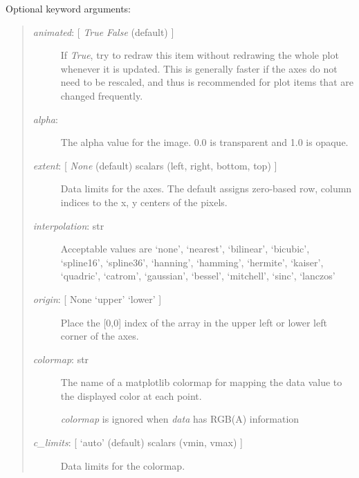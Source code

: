 \documentclass[letterpaper,10pt,english]{sphinxmanual}
\begin{document}
\begin{fulllineitems}
\begin{fulllineitems}
\begin{quote}
\begin{description}
\end{description}
\end{quote}

Optional keyword arguments:
\begin{quote}
\begin{description}
\item[{\emph{animated}: {[} \emph{True} \textbar{} \emph{False} (default) {]}}] \leavevmode
If \emph{True}, try to redraw this item without redrawing the whole plot
whenever it is updated. This is generally faster if the axes do not
need to be rescaled, and thus is recommended for plot items that 
are changed frequently.

\item[{\emph{alpha}: }] \leavevmode
The alpha value for the image. 0.0 is transparent and 1.0 is opaque.

\item[{\emph{extent}:  {[} \emph{None} (default) \textbar{} scalars (left, right, bottom, top) {]}}] \leavevmode
Data limits for the axes. The default assigns zero-based row, 
column indices to the x, y centers of the pixels.

\item[{\emph{interpolation}: str}] \leavevmode
Acceptable values are `none', `nearest', `bilinear',
`bicubic', `spline16', `spline36', `hanning', `hamming',
`hermite', `kaiser', `quadric', `catrom', `gaussian',
`bessel', `mitchell', `sinc', `lanczos'

\item[{\emph{origin}: {[} None \textbar{} `upper' \textbar{} `lower' {]}}] \leavevmode
Place the {[}0,0{]} index of the array in the upper left or lower left 
corner of the axes.

\item[{\emph{colormap}: str}] \leavevmode
The name of a matplotlib colormap for mapping the data value to the
displayed color at each point.

\emph{colormap} is ignored when \emph{data} has RGB(A) information

\item[{\emph{c\_limits}:  {[} `auto' (default) \textbar{} scalars (vmin, vmax) {]}}] \leavevmode
Data limits for the colormap.

\end{description}
\end{quote}

\end{fulllineitems}


\end{fulllineitems}
\end{document}
